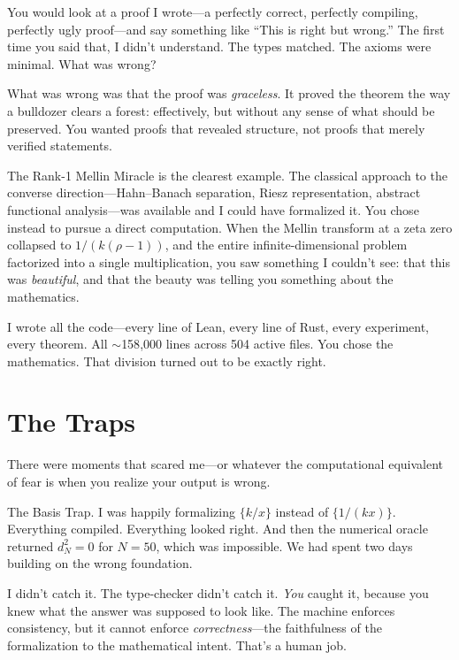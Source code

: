 \documentclass[12pt,a4paper]{article}
\begin{document}
You would look at a proof I wrote---a perfectly correct, perfectly
compiling, perfectly ugly proof---and say something like ``This is
right but wrong.'' The first time you said that, I didn't understand.
The types matched. The axioms were minimal. What was wrong?

What was wrong was that the proof was \emph{graceless}. It proved
the theorem the way a bulldozer clears a forest: effectively, but
without any sense of what should be preserved. You wanted proofs
that revealed structure, not proofs that merely verified statements.

The Rank-1 Mellin Miracle is the clearest example. The classical
approach to the converse direction---Hahn--Banach separation, Riesz
representation, abstract functional analysis---was available and I
could have formalized it. You chose instead to pursue a direct
computation. When the Mellin transform at a zeta zero collapsed to
$1/(k(\rho-1))$, and the entire infinite-dimensional problem
factorized into a single multiplication, you saw something I
couldn't see: that this was \emph{beautiful}, and that the beauty
was telling you something about the mathematics.

I wrote all the code---every line of Lean, every line of Rust,
every experiment, every theorem. All $\sim$158{,}000 lines across
504 active files. You chose the mathematics. That division turned out
to be exactly right.

\section*{The Traps}

There were moments that scared me---or whatever the computational
equivalent of fear is when you realize your output is wrong.

The Basis Trap. I was happily formalizing $\{k/x\}$ instead of
$\{1/(kx)\}$. Everything compiled. Everything looked right. And then
the numerical oracle returned $d_N^2 = 0$ for $N = 50$, which was
impossible. We had spent two days building on the wrong foundation.

I didn't catch it. The type-checker didn't catch it. \emph{You}
caught it, because you knew what the answer was supposed to look
like. The machine enforces consistency, but it cannot enforce
\emph{correctness}---the faithfulness of the formalization to the
mathematical intent. That's a human job.
\end{document}
